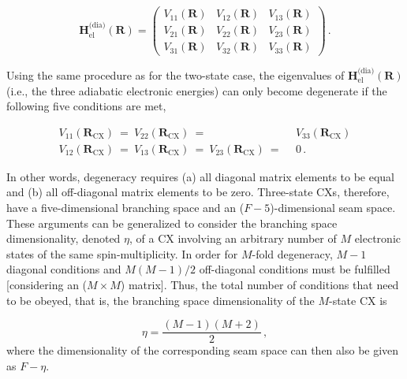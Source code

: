 \documentclass[9pt,bestpractices]{livecoms}
\newcommand{\R}{\mathbf{R}}
\begin{document}
\begin{equation}
\label{dia_elec_ham_3_state}
     \mathbf{H}_{\text{el}}^{\text{(dia)}}(\R) =
    \begin{pmatrix}
        V_{11}(\R) & V_{12}(\R) & V_{13}(\R)\\
        V_{21}(\R) & V_{22}(\R) & V_{23}(\R)\\
        V_{31}(\R) & V_{32}(\R) & V_{33}(\R)
    \end{pmatrix} \, .
\end{equation}

Using the same procedure as for the two-state case, the eigenvalues of $\mathbf{H}_{\text{el}}^{\text{(dia)}}(\R)$ (i.e., the three adiabatic electronic energies) can only become degenerate if the following five conditions are met,

\begin{equation}
\label{degen_cond_3_state}
\begin{split}
    V_{11}(\R_{\text{CX}}) \: = \: V_{22}(\R_{\text{CX}}) \: =& \:\: V_{33}(\R_{\text{CX}})\\
    V_{12}(\R_{\text{CX}}) \: = \: V_{13}(\R_{\text{CX}}) \: = \: V_{23}(\R_{\text{CX}}) \: =& \:\: 0 \, .
\end{split}
\end{equation}

In other words, degeneracy requires (a) all diagonal matrix elements to be equal and (b) all off-diagonal matrix elements to be zero.
Three-state CXs, therefore, have a five-dimensional branching space and an ($F - 5$)-dimensional seam space.
These arguments can be generalized to consider the branching space dimensionality, denoted $\eta$, of a CX involving an arbitrary number of $M$ electronic states of the same spin-multiplicity.
In order for $M$-fold degeneracy, $M - 1$ diagonal conditions and $M(M - 1)/2$ off-diagonal conditions must be fulfilled [considering an ($M \times M$) matrix].\cite{lipkowitz_conical_2007}
Thus, the total number of conditions that need to be obeyed, that is, the branching space dimensionality of the $M$-state CX is

\begin{equation}
\label{num_degen_conds}
    \eta = \frac{\left( M - 1 \right)\left( M + 2 \right)}{2} \, ,
\end{equation}
where the dimensionality of the corresponding seam space can then also be given as $F - \eta$.
\end{document}
